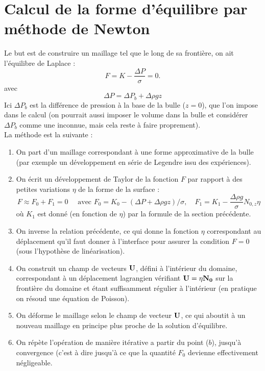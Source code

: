 \documentclass[a4paper]{report}
\begin{document}
\section{Calcul de la forme d'équilibre par méthode de Newton}\label{Newton}
Le but est de construire un maillage tel que le long de sa frontière, on ait l'équilibre de Laplace :
\begin{equation}
F = K - \frac{\Delta P}{\sigma} = 0.
\end{equation}
avec 
$$
\Delta P = \Delta P_b + \Delta \rho g z
$$
Ici $\Delta P_b$ est la différence de pression à la base de la bulle ($z=0$), que l'on impose dans le calcul (on pourrait aussi imposer le volume dans la bulle et considérer $\Delta P_b$ comme une inconnue, mais cela reste à faire proprement).\\
La méthode est la suivante :
\begin{enumerate}
\item On part d'un maillage correspondant à une forme approximative de la bulle (par exemple un développement en série de Legendre issu des expériences).
\item On écrit un développement de Taylor de la fonction $F$ par rapport à des petites variations $\eta$ de la forme de la surface :
$$ 
F \approx F_0 + F_1 = 0 \quad  \mbox{ avec } 
F_0 = K_0 - (\Delta P + \Delta \rho g z)/ \sigma , 
\quad  
F_1 = K_1 - \frac{\Delta \rho g}{\sigma} N_{0,z} \eta
$$
où $K_1$ est donné (en fonction de $\eta$) par la formule de la section précédente.
\item On inverse la relation précédente, ce qui donne la fonction $\eta$ correspondant au déplacement qu'il faut donner à l'interface pour assurer la condition $F=0$ (sous l'hypothèse de linéarisation).
\item On construit un champ de vecteurs $\bf U$, défini à l'intérieur du domaine, correspondant à un déplacement lagrangien vérifiant ${\bf U} = \eta {\bf N_0}$ sur la frontière du domaine et étant suffisamment régulier à l'intérieur (en pratique on résoud une équation de Poisson).
\item On déforme le maillage selon le champ de vecteur $\bf U$, ce qui aboutit à un nouveau maillage en principe plus proche de la solution d'équilibre.
\item On répète l'opération de manière itérative a partir du point ($b$), jusqu'à convergence
(c'est à dire jusqu'à ce que la quantité $F_0$ devienne effectivement négligeable.
\end{enumerate}
\end{document}
